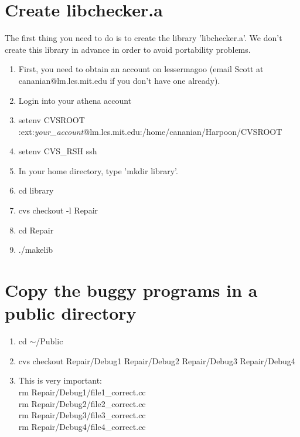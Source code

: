 \documentclass{article}
\title{}
\author{Instructions for the organizers}
\date{July 30, 2003}
\begin{document}
\maketitle
\begin{flushleft}

\thispagestyle{empty}

\section{Create libchecker.a}
The first thing you need to do is to create the library 'libchecker.a'.
We don't create this library in advance in order to avoid portability problems.

\vspace{0.1in}

\begin{enumerate}
\item{First, you need to obtain an account on lessermagoo (email Scott at 
cananian@lm.lcs.mit.edu if you don't have one already).}
\item{Login into your athena account}
\item{setenv CVSROOT :ext:{\it your\_account}@lm.lcs.mit.edu:/home/cananian/Harpoon/CVSROOT}
\item{setenv CVS\_RSH ssh}
\item{In your home directory, type 'mkdir library'.}
\item{cd library}
\item{cvs checkout -l Repair}
\item{cd Repair}
\item{./makelib}
\end{enumerate}


\section{Copy the buggy programs in a public directory}
\begin{enumerate}
\item{cd $\sim$/Public}
\item{cvs checkout Repair/Debug1 Repair/Debug2 Repair/Debug3 Repair/Debug4}
\item{This is very important:\\
         rm Repair/Debug1/file1\_correct.cc \\
         rm Repair/Debug2/file2\_correct.cc \\
         rm Repair/Debug3/file3\_correct.cc \\
         rm Repair/Debug4/file4\_correct.cc}


\end{enumerate}
\end{flushleft}
\end{document}
